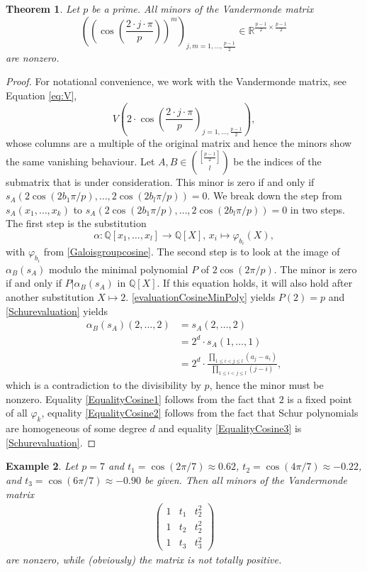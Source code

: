 \documentclass[a4paper]{article}
\newcommand{\Q}{\ensuremath{\mathbb{Q}}}
\newcommand{\R}{\ensuremath{\mathbb{R}}}
\newtheorem{theorem}{Theorem}[]
\newtheorem{example}[theorem]{Example}
\numberwithin{equation}{section}
\numberwithin{table}{section}
\numberwithin{figure}{section}
\begin{document}
\begin{theorem}\label{VandermondeCosine}
    Let $p$ be a prime. All minors of the Vandermonde matrix 
    \[
    \left(\left(\cos\left(\frac{2 \cdot j \cdot \pi}{p}\right)\right)^{m}\right)_{j,m=1,\ldots,\frac{p-1}{2}}
    \in\R^{\frac{p-1}{2}\times\frac{p-1}{2}}
    \]
    are nonzero.
\end{theorem}

\begin{proof}
    For notational convenience, we work with the Vandermonde matrix, see Equation \eqref{eq:V},
    \[
    V\left(2 \cdot \cos \left(\frac{2 \cdot j \cdot \pi}{p}\right) _{j=1,\ldots,\frac{p-1}{2}}\right),
    \]
    whose columns are a multiple of the original matrix and hence the minors show the same vanishing behaviour. Let $A,B \in \binom{[\frac{p-1}{2}]}{l}$ be the indices of the submatrix that is under consideration. This minor is zero if and only if $s_A(2\cos(2 b_1 \pi /p),\ldots,2\cos(2 b_l \pi /p))=0$. We break down the step from $s_A(x_1,\ldots,x_k)$ to $s_A(2\cos(2 b_1 \pi /p),\ldots,2\cos(2 b_l \pi /p))=0$ in two steps. The first step is the substitution
    \[\alpha \colon \Q[x_1,\ldots,x_l] \to \Q[X] \text{, } x_i \mapsto \varphi_{b_i}(X),\]
    with $\varphi_{b_i}$ from \cref{Galoisgroupcosine}. The second step is to look at the image of $\alpha_B(s_A)$ modulo the minimal polynomial $P$ of $2\cos(2 \pi /p)$.
    The minor is zero if and only if $P|\alpha_B(s_A)$ in $\Q[X]$. If this equation holds, it will also hold after another substitution $X \mapsto 2$. \cref{evaluationCosineMinPoly} yields $P(2)=p$ and \cref{Schurevaluation} yields
    \begin{align}\label{EqualityCosine1}
    \alpha_B(s_A)(2,\ldots,2) &= s_A(2,\ldots,2)\\
    \label{EqualityCosine2}&=2^d \cdot  s_A(1,\ldots,1) \\
    \label{EqualityCosine3}&= 2^d \cdot \frac{\prod\limits_{1\leq i < j \leq l}(a_j-a_i)}{\prod\limits_{1\leq i < j \leq l}(j-i)},
    \end{align}
    which is a contradiction to the divisibility by $p$, hence the minor must be nonzero. Equality \cref{EqualityCosine1} follows from the fact that $2$ is a fixed point of all $\varphi_k$, equality \cref{EqualityCosine2} follows from the fact that Schur polynomials are homogeneous of some degree $d$ and equality \cref{EqualityCosine3} is \cref{Schurevaluation}.
\end{proof}

\begin{example}
 Let $p=7$ and $t_1=\cos(2\pi/7)\approx 0.62$, $t_2=\cos(4\pi/7)\approx -0.22$, and $t_3=\cos(6\pi/7)\approx -0.90$ be given. Then all minors of the Vandermonde matrix
 \begin{align*}
  \begin{pmatrix}
    1 & t_1 & t_2^2\\
    1 & t_2 & t_2^2\\
    1 & t_3 & t_3^2
  \end{pmatrix}
 \end{align*}
 are nonzero, while (obviously) the matrix is not totally positive.
\end{example}
\end{document}
